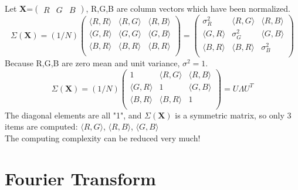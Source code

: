 \documentclass[a4paper,12pt]{article}
\begin{document}
\begin{compactitem}
\[\]
Let \textbf{X}=$\begin{pmatrix} R & G & B \end{pmatrix}$, R,G,B are column vectors which have been normalized.
\[
\Sigma(\textbf{X})=(1/N)
\begin{pmatrix}
       \langle R, R \rangle	& \langle R, G \rangle 	& \langle R, B	\rangle \\[0.3em]
       \langle G, R \rangle 	& \langle G, G \rangle		& \langle G, B	\rangle \\[0.3em]
       \langle B, R \rangle	& \langle B, R \rangle 	& \langle B, R	\rangle	\\[0.3em]
\end{pmatrix}
=
\begin{pmatrix}
       \sigma_R^2 & \langle R, G \rangle 	& \langle R, B	\rangle \\[0.3em]
       \langle G, R \rangle 	& \sigma_G^2		& \langle G, B	\rangle \\[0.3em]
       \langle B, R \rangle	& \langle B, R \rangle 	& \sigma_B^2	\\[0.3em]
\end{pmatrix}
\]
Because R,G,B are zero mean and unit variance, $\sigma^2=1$.
\begin{equation}
\label{eq:covar-norm-RGB}
\Sigma(\textbf{X})=(1/N)
\begin{pmatrix}
       1 							& \langle R, G \rangle 	& \langle R, B	\rangle \\[0.3em]
       \langle G, R \rangle 		& 1							& \langle G, B	\rangle \\[0.3em]
       \langle B, R \rangle		& \langle B, R \rangle 	& 1	\\[0.3em]
\end{pmatrix}
= U\Lambda U^T
\end{equation}
The diagonal elements are all "1", and $\Sigma(\textbf{X})$ is a symmetric matrix, so only 3 items are computed: $\langle R, G \rangle$, $\langle R, B	\rangle$, $\langle G, B	\rangle$
\\The computing complexity can be reduced very much!

\end{compactitem}



\section{Fourier Transform}
\end{document}

